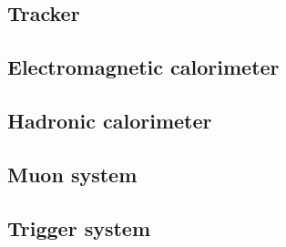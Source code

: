 \subsection{Tracker}
\label{sec:tracker}

\subsection{Electromagnetic calorimeter}
\label{sec:ECAL}

\subsection{Hadronic calorimeter}
\label{sec:HCAL}

\subsection{Muon system}


\subsection{Trigger system}
\label{sec:triggers}

